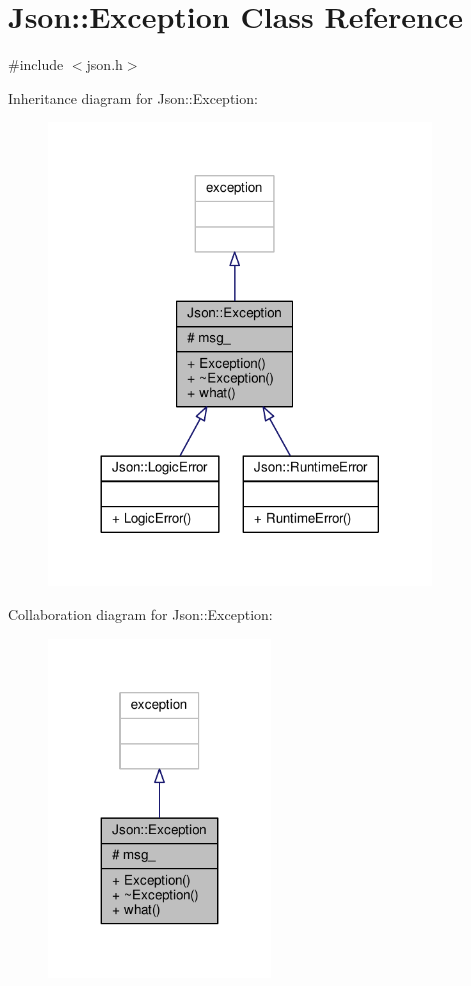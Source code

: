 \hypertarget{classJson_1_1Exception}{}\section{Json\+:\+:Exception Class Reference}
\label{classJson_1_1Exception}


{\ttfamily \#include $<$json.\+h$>$}



Inheritance diagram for Json\+:\+:Exception\+:
\nopagebreak
\begin{figure}[H]
\begin{center}
\leavevmode
\includegraphics[width=288pt]{dc/d85/classJson_1_1Exception__inherit__graph}
\end{center}
\end{figure}


Collaboration diagram for Json\+:\+:Exception\+:
\nopagebreak
\begin{figure}[H]
\begin{center}
\leavevmode
\includegraphics[width=167pt]{d3/d6f/classJson_1_1Exception__coll__graph}
\end{center}
\end{figure}
